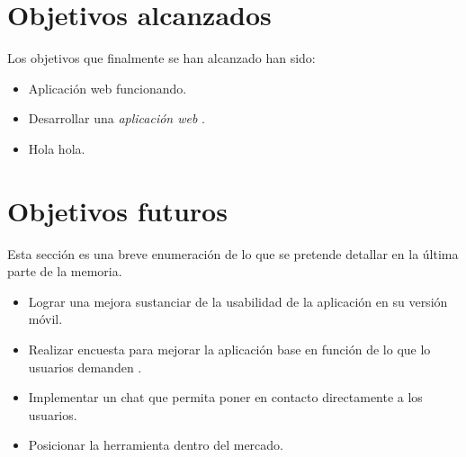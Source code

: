 \section{Objetivos alcanzados}\label{objetivos-alcanzados}
Los objetivos que finalmente se han alcanzado han sido: 
\begin{itemize}
\tightlist
\item
  Aplicación web funcionando. 
\item
  Desarrollar una \emph{aplicación web} . 
\item
  Hola hola.
\end{itemize}

\section{Objetivos futuros}\label{objetivos-futuros}
Esta sección es una breve enumeración de lo que se pretende detallar en la última parte de la memoria.

\begin{itemize}
\tightlist
\item
  Lograr una mejora sustanciar de la usabilidad de la aplicación en su versión móvil. 
\item
  Realizar encuesta para mejorar la aplicación base en función de lo que lo usuarios demanden . 
\item
  Implementar un chat que permita poner en contacto directamente a los usuarios.
\item
  Posicionar la herramienta dentro del mercado.
\end{itemize}